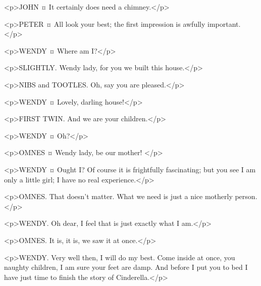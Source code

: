 <p>JOHN ¤
It certainly does need a chimney.</p>


<p>PETER ¤
All look your best; the first impression is awfully important.
</p>

<p>WENDY ¤
Where am I?</p>

<p>SLIGHTLY. Wendy lady, for you we built this house.</p>

<p>NIBS and TOOTLES. Oh, say you are pleased.</p>

<p>WENDY ¤
Lovely, darling house!</p>

<p>FIRST TWIN. And we are your children.</p>

<p>WENDY ¤
Oh?</p>

<p>OMNES ¤
Wendy lady, be our mother!
</p>

<p>WENDY ¤
Ought I? Of course it is frightfully fascinating; but you see I am only a little girl; I have no real experience.</p>

<p>OMNES. That doesn't matter. What we need is just a nice motherly person.</p>

<p>WENDY. Oh dear, I feel that is just exactly what I am.</p>

<p>OMNES. It is, it is, we saw it at once.</p>

<p>WENDY. Very well then, I will do my best.
Come inside at once, you naughty children, I am sure your feet are damp. And before I put you to bed I have just time to finish the story of Cinderella.</p>

